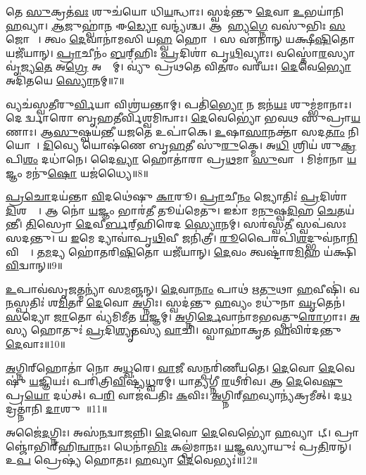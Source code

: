 𑌤𑍇 \ul{𑌸𑍁}𑌕𑍍𑌰𑌤॑\ul{𑌵𑌃} 𑌶𑍁𑌚॑𑌯𑍋 𑌧𑌿\ul{𑌯}𑌨𑍍𑌧𑌾𑌃।
𑌸𑍍𑌵𑌦॑𑌨𑍍𑌤𑍁 \ul{𑌦𑍇}𑌵𑌾 \ul{𑌉}𑌭𑌯𑌾॑𑌨𑌿 \ul{𑌹}𑌵𑍍𑌯𑌾।
\ul{𑌆}𑌜𑍁𑌹𑍍𑌵𑌾॑\ul{𑌨} 𑌈\ul{𑌡𑍍𑌯𑍋} 𑌵𑌨𑍍𑌦𑍍𑌯॑𑌶𑍍𑌚।
𑌆𑌯𑌾᳚𑌹𑍍𑌯\ul{𑌗𑍍𑌨𑍇} 𑌵𑌸𑍁॑𑌭𑌿𑌃 \ul{𑌸}𑌜𑍋𑌷𑌾𑌃᳚।
𑌤𑍍𑌵𑌂 \ul{𑌦𑍇}𑌵𑌾𑌨𑌾॑𑌮𑌸𑌿 𑌯\ul{𑌹𑍍𑌵} 𑌹𑍋𑌤𑌾᳚।
𑌸 𑌏॑𑌨𑌾𑌨𑍍 𑌯𑌕𑍍𑌷𑍀\ul{𑌷𑌿}𑌤𑍋 𑌯𑌜𑍀॑𑌯𑌾𑌨𑍍।
\ul{𑌪𑍍𑌰𑌾}𑌚𑍀𑌨𑌂॑ \ul{𑌬}॒𑌰𑍍‌॒\mbox{}𑌹𑌿𑌃 \ul{𑌪𑍍𑌰}𑌦𑌿𑌶𑌾॑ 𑌪𑍃\ul{𑌥𑌿}𑌵𑍍𑌯𑌾𑌃।
𑌵𑌸𑍍𑌤𑍋॑\ul{𑌰}𑌸𑍍𑌯𑌾 𑌵𑍃॑𑌜𑍍𑌯\ul{𑌤𑍇} 𑌅\ul{𑌗𑍍𑌰𑍇} 𑌅𑌹𑍍𑌨𑌾᳚𑌮𑍍।
𑌵𑍍𑌯𑍁॑ 𑌪𑍍𑌰𑌥𑌤𑍇 𑌵𑌿\ul{𑌤}𑌰𑌂 𑌵𑌰𑍀॑𑌯𑌃।
\ul{𑌦𑍇}𑌵𑍇\ul{𑌭𑍍𑌯𑍋} 𑌅𑌦𑌿॑𑌤𑌯𑍇 \ul{𑌸𑍍𑌯𑍋}𑌨𑌮𑍍॥7॥

𑌵𑍍𑌯𑌚॑𑌸𑍍𑌵𑌤𑍀𑌰𑍁\ul{𑌰𑍍𑌵𑌿}𑌯𑌾 𑌵𑌿𑌶𑍍𑌰॑𑌯𑌨𑍍𑌤𑌾𑌮𑍍।
𑌪𑌤𑌿॑\ul{𑌭𑍍𑌯𑍋} 𑌨 𑌜𑌨॑\ul{𑌯𑌃} 𑌶𑍁𑌮𑍍𑌭॑𑌮𑌾𑌨𑌾𑌃।
𑌦𑍇𑌵𑍀᳚𑌰𑍍𑌦𑍍𑌵𑌾𑌰𑍋 𑌬𑍃𑌹𑌤𑍀𑌰𑍍𑌵𑌿𑌶𑍍𑌵𑌮𑌿𑌨𑍍𑌵𑌾𑌃।
\ul{𑌦𑍇}𑌵𑍇𑌭𑍍𑌯𑍋॑ 𑌭𑌵𑌥 𑌸𑍁𑌪𑍍𑌰𑌾\ul{𑌯}𑌣𑌾𑌃।
𑌆\ul{𑌸𑍁}𑌷𑍍𑌵𑌯॑𑌨𑍍𑌤𑍀 𑌯\ul{𑌜}𑌤𑍇 𑌉𑌪𑌾॑𑌕𑍇।
\ul{𑌉}𑌷𑌾\ul{𑌸𑌾}𑌨𑌕𑍍𑌤𑌾॑ 𑌸𑌦\ul{𑌤𑌾𑌂} 𑌨𑌿 𑌯𑍋𑌨𑍗᳚।
\ul{𑌦𑌿}𑌵𑍍𑌯𑍇 𑌯𑍋𑌷॑𑌣𑍇 𑌬𑍃\ul{𑌹}𑌤𑍀 𑌸𑍁॑\ul{𑌰𑍁}𑌕𑍍𑌮𑍇।
𑌅\ul{𑌧𑌿} 𑌶𑍍𑌰𑌿𑌯॑ 𑌶𑍁\ul{𑌕𑍍𑌰}𑌪𑌿\ul{𑌶𑌂} 𑌦𑌧𑌾॑𑌨𑍇।
𑌦𑍈\ul{𑌵𑍍𑌯𑌾} 𑌹𑍋𑌤𑌾॑𑌰𑌾 𑌪𑍍𑌰\ul{𑌥}𑌮𑌾 \ul{𑌸𑍁}𑌵𑌾𑌚𑌾᳚।
𑌮𑌿𑌮𑌾॑𑌨𑌾 \ul{𑌯}𑌜𑍍𑌞𑌂 𑌮𑌨𑍁॑\ul{𑌷𑍋} 𑌯𑌜॑𑌧𑍍𑌯𑍈॥8॥

\ul{𑌪𑍍𑌰}\ul{𑌚𑍋}𑌦𑌯॑𑌨𑍍𑌤𑌾 \ul{𑌵𑌿}𑌦𑌥𑍇॑𑌷𑍁 \ul{𑌕𑌾}𑌰𑍂।
\ul{𑌪𑍍𑌰𑌾}𑌚𑍀\ul{𑌨𑌂} 𑌜𑍍𑌯𑍋𑌤𑌿𑌃॑ \ul{𑌪𑍍𑌰}𑌦𑌿𑌶𑌾॑ \ul{𑌦𑌿}𑌶𑌨𑍍𑌤𑌾᳚।
𑌆 𑌨𑍋॑ \ul{𑌯}𑌜𑍍𑌞𑌂 𑌭𑌾𑌰॑\ul{𑌤𑍀} 𑌤𑍂𑌯॑𑌮𑍇𑌤𑍁।
𑌇𑌡𑌾॑ 𑌮\ul{𑌨𑍁}𑌷𑍍𑌵\ul{𑌦𑌿}𑌹 \ul{𑌚𑍇}𑌤𑌯॑𑌨𑍍𑌤𑍀।
\ul{𑌤𑌿}𑌸𑍍𑌰𑍋 \ul{𑌦𑍇}𑌵𑍀\ul{𑌰𑍍𑌬}𑌰𑍍‌॒\mbox{}𑌹𑌿𑌰𑍇𑌦 \ul{𑌸𑍍𑌯𑍋}𑌨𑌮𑍍।
𑌸𑌰॑𑌸𑍍𑌵\ul{𑌤𑍀} 𑌸𑍍𑌵𑌪॑𑌸𑌃 𑌸𑌦𑌨𑍍𑌤𑍁।
𑌯 \ul{𑌇}𑌮𑍇 𑌦𑍍𑌯𑌾𑌵𑌾॑𑌪𑍃\ul{𑌥𑌿}𑌵𑍀 𑌜𑌨𑌿॑𑌤𑍍𑌰𑍀।
\ul{𑌰𑍂}𑌪𑍈𑌰𑌪𑌿॑\ul{𑌶}𑌦𑍍𑌭𑍁𑌵॑𑌨𑌾\ul{𑌨𑌿} 𑌵𑌿𑌶𑍍𑌵𑌾᳚।
𑌤\ul{𑌮}𑌦𑍍𑌯 𑌹𑍋॑𑌤𑌰𑌿\ul{𑌷𑌿}𑌤𑍋 𑌯𑌜𑍀॑𑌯𑌾𑌨𑍍।
\ul{𑌦𑍇}𑌵𑌂 𑌤𑍍𑌵𑌷𑍍𑌟𑌾॑𑌰\ul{𑌮𑌿}𑌹 𑌯॑𑌕𑍍𑌷𑌿 \ul{𑌵𑌿}𑌦𑍍𑌵𑌾𑌨𑍍॥9॥

\ul{𑌉}𑌪𑌾𑌵॑𑌸𑍃\ul{𑌜}𑌤𑍍𑌮𑌨𑍍𑌯𑌾॑ 𑌸\ul{𑌮}𑌞𑍍𑌜𑌨𑍍।
\ul{𑌦𑍇}𑌵𑌾\ul{𑌨𑌾𑌂} 𑌪𑌾𑌥॑ 𑌋\ul{𑌤𑍁}𑌥𑌾 \ul{𑌹}𑌵𑍀𑌷𑌿॑।
𑌵\ul{𑌨}𑌸𑍍𑌪𑌤𑌿𑌃॑ 𑌶\ul{𑌮𑌿}𑌤𑌾 \ul{𑌦𑍇}𑌵𑍋 \ul{𑌅}𑌗𑍍𑌨𑌿𑌃।
𑌸𑍍𑌵𑌦॑𑌨𑍍𑌤𑍁 \ul{𑌹}𑌵𑍍𑌯𑌂 𑌮𑌧𑍁॑𑌨𑌾 \ul{𑌘𑍃}𑌤𑍇𑌨॑।
\ul{𑌸}𑌦𑍍𑌯𑍋 \ul{𑌜𑌾}𑌤𑍋 𑌵𑍍𑌯॑𑌮𑌿𑌮𑍀𑌤 \ul{𑌯}𑌜𑍍𑌞𑌮𑍍।
\ul{𑌅}𑌗𑍍𑌨𑌿\ul{𑌰𑍍𑌦𑍇}𑌵𑌾𑌨𑌾॑𑌮𑌭𑌵𑌤𑍍𑌪𑍁\ul{𑌰𑍋}𑌗𑌾𑌃।
\ul{𑌅}𑌸𑍍𑌯 𑌹𑍋𑌤𑍁𑌃॑ \ul{𑌪𑍍𑌰}𑌦𑌿\ul{𑌶𑍍𑌯𑍃}𑌤𑌸𑍍𑌯॑ \ul{𑌵𑌾}𑌚𑌿।
𑌸𑍍𑌵𑌾𑌹𑌾॑𑌕𑍃𑌤 \ul{𑌹}𑌵𑌿𑌰॑𑌦𑌨𑍍𑌤𑍁 \ul{𑌦𑍇}𑌵𑌾𑌃॥10॥\anuvakamend[\ul{𑌯}𑌜𑍍𑌞𑍈𑌃 \ul{𑌸𑍍𑌯𑍋}𑌨𑌂 𑌯𑌜॑𑌧𑍍𑌯𑍈 \ul{𑌵𑌿}𑌦𑍍𑌵𑌾\ul{𑌨}𑌷𑍍𑌟𑍗 𑌚॑]

\ul{𑌅}𑌗𑍍𑌨𑌿𑌰𑍍‌\mbox{}𑌹𑍋𑌤𑌾॑ 𑌨𑍋 𑌅\ul{𑌧𑍍𑌵}𑌰𑍇।
\ul{𑌵𑌾}𑌜𑍀 𑌸𑌨𑍍𑌪𑌰𑌿॑𑌣𑍀𑌯𑌤𑍇।
\ul{𑌦𑍇}𑌵𑍋 \ul{𑌦𑍇}𑌵𑍇𑌷𑍁॑ \ul{𑌯}𑌜𑍍𑌞𑌿𑌯𑌃॑।
𑌪𑌰𑌿॑𑌤𑍍𑌰𑌿\ul{𑌵𑌿}𑌷𑍍𑌟𑍍𑌯॑\ul{𑌧𑍍𑌵}𑌰𑌮𑍍।
𑌯𑌾\ul{𑌤𑍍𑌯}𑌗𑍍𑌨𑍀 \ul{𑌰}𑌥𑍀𑌰𑌿॑𑌵।
𑌆 \ul{𑌦𑍇}𑌵𑍇\ul{𑌷𑍁} 𑌪𑍍𑌰\ul{𑌯𑍋} 𑌦𑌧॑𑌤𑍍।
𑌪\ul{𑌰𑌿} 𑌵𑌾𑌜॑𑌪𑌤𑌿𑌃 \ul{𑌕}𑌵𑌿𑌃।
\ul{𑌅}𑌗𑍍𑌨𑌿𑌰𑍍‌\mbox{}\ul{𑌹}𑌵𑍍𑌯𑌾𑌨𑍍𑌯॑𑌕𑍍𑌰𑌮𑍀𑌤𑍍।
𑌦\ul{𑌧}𑌦𑍍𑌰𑌤𑍍𑌨𑌾॑𑌨𑌿 \ul{𑌦𑌾}𑌶𑍁𑌷𑍇᳚॥11॥\anuvakamend[\ul{𑌅}𑌗𑍍𑌨𑌿𑌰𑍍‌\mbox{}𑌹𑍋𑌤𑌾॑ \ul{𑌨𑍋} 𑌨𑌵॑]

𑌅𑌜𑍈॑\ul{𑌦}𑌗𑍍𑌨𑌿𑌃।
𑌅𑌸॑\ul{𑌨}𑌦𑍍𑌵𑌾\ul{𑌜}𑌨𑍍𑌨𑌿।
\ul{𑌦𑍇}𑌵𑍋 \ul{𑌦𑍇}𑌵𑍇𑌭𑍍𑌯𑍋॑ \ul{𑌹}𑌵𑍍𑌯𑌾𑌵𑌾᳚𑌟𑍍।
𑌪𑍍𑌰𑌾𑌞𑍍𑌜𑍋॑𑌭𑌿𑌰𑍍‌\mbox{}𑌹𑌿\ul{𑌨𑍍𑌵𑌾}𑌨𑌃।
𑌧𑍇𑌨𑌾॑\ul{𑌭𑌿𑌃} 𑌕𑌲𑍍𑌪॑𑌮𑌾𑌨𑌃।
\ul{𑌯}𑌜𑍍𑌞𑌸𑍍𑌯𑌾𑌯𑍁𑌃॑ 𑌪𑍍𑌰\ul{𑌤𑌿}𑌰𑌨𑍍।
𑌉\ul{𑌪} 𑌪𑍍𑌰𑍇𑌷𑍍𑌯॑ 𑌹𑍋𑌤𑌃।
\ul{𑌹}𑌵𑍍𑌯𑌾 \ul{𑌦𑍇}𑌵𑍇𑌭𑍍𑌯𑌃॑॥12॥\anuvakamend[𑌅𑌜𑍈॑\ul{𑌦}𑌷𑍍𑌟𑍗]


